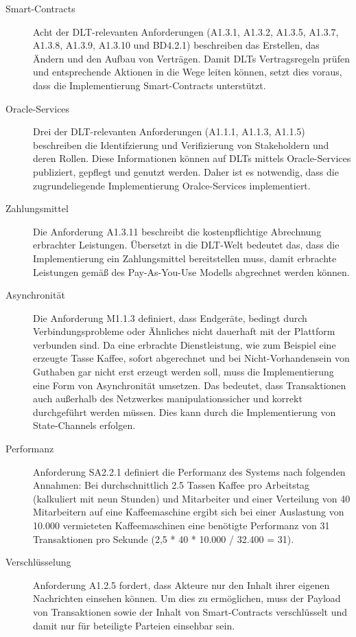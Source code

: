\begin{description}
  \item[Smart-Contracts] Acht der \ac{DLT}-relevanten Anforderungen (A1.3.1, A1.3.2, A1.3.5, A1.3.7, A1.3.8, A1.3.9, A1.3.10 und BD4.2.1) beschreiben das Erstellen, das Ändern und den Aufbau von Verträgen. Damit \acp{DLT} Vertragsregeln prüfen und entsprechende Aktionen in die Wege leiten können, setzt dies voraus, dass die Implementierung Smart-Contracts unterstützt.
  \item[Oracle-Services] Drei der \ac{DLT}-relevanten Anforderungen (A1.1.1, A1.1.3, A1.1.5) beschreiben die Identifzierung und Verifizierung von Stakeholdern und deren Rollen. Diese Informationen können auf \acp{DLT} mittels Oracle-Services publiziert, gepflegt und genutzt werden. Daher ist es notwendig, dass die zugrundeliegende Implementierung Oralce-Services implementiert.
  \item[Zahlungsmittel] Die Anforderung A1.3.11 beschreibt die kostenpflichtige Abrechnung erbrachter Leistungen. Übersetzt in die \ac{DLT}-Welt bedeutet das, dass die Implementierung ein Zahlungsmittel bereitstellen muss, damit erbrachte Leistungen gemäß des Pay-As-You-Use Modells abgrechnet werden können.
  \item[Asynchronität] Die Anforderung M1.1.3 definiert, dass Endgeräte, bedingt durch Verbindungsprobleme oder Ähnliches nicht dauerhaft mit der Plattform verbunden sind. Da eine erbrachte Dienstleistung, wie zum Beispiel eine erzeugte Tasse Kaffee, sofort abgerechnet und bei Nicht-Vorhandensein von Guthaben gar nicht erst erzeugt werden soll, muss die Implementierung eine Form von Asynchronität umsetzen. Das bedeutet, dass Transaktionen auch außerhalb des Netzwerkes manipulationssicher und korrekt durchgeführt werden müssen. Dies kann durch die Implementierung von State-Channels erfolgen.
  \item[Performanz] Anforderung SA2.2.1 definiert die Performanz des Systems nach folgenden Annahmen: Bei durchschnittlich 2.5 Tassen Kaffee pro Arbeitstag (kalkuliert mit neun Stunden) und Mitarbeiter und einer Verteilung von 40 Mitarbeitern auf eine Kaffeemaschine ergibt sich bei einer Auslastung von 10.000 vermieteten Kaffeemaschinen eine benötigte Performanz von 31 Transaktionen pro Sekunde (2,5 * 40 * 10.000 / 32.400 = 31).
  \item[Verschlüsselung] Anforderung A1.2.5 fordert, dass Akteure nur den Inhalt ihrer eigenen Nachrichten einsehen können. Um dies zu ermöglichen, muss der Payload von Transaktionen sowie der Inhalt von Smart-Contracts verschlüsselt und damit nur für beteiligte Parteien einsehbar sein.
\end{description}
